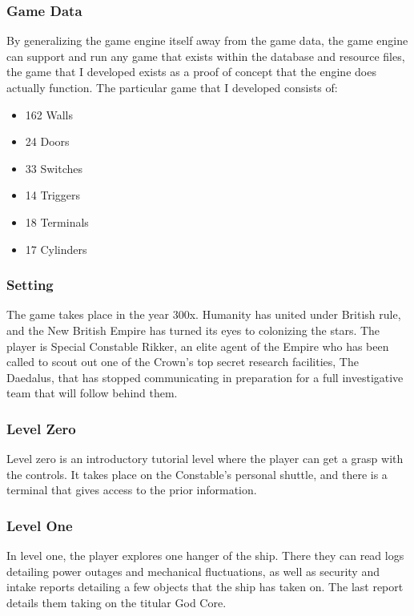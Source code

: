 \documentclass{article}
\begin{document}
\subsubsection{Game Data} \label{subsubsec:gamedata}

By generalizing the game engine itself away from the game data, the game engine can support and run any game that exists within the database and resource files, the game that I developed exists as a proof of concept that the engine does actually function. The particular game that I developed consists of:

\begin{itemize}
	\item 162 Walls
	\item 24 Doors
	\item 33 Switches
	\item 14 Triggers
	\item 18 Terminals
	\item 17 Cylinders
\end{itemize}

\subsubsection{Setting} \label{subsubsec:setting}

The game takes place in the year 300x. Humanity has united under British rule, and the New British Empire has turned its eyes to colonizing the stars. The player is Special Constable Rikker, an elite agent of the Empire who has been called to scout out one of the Crown's top secret research facilities, The Daedalus, that has stopped communicating in preparation for a full investigative team that will follow behind them.

\subsubsection{Level Zero} \label{subsubsec:levelzero}

Level zero is an introductory tutorial level where the player can get a grasp with the controls. It takes place on the Constable's personal shuttle, and there is a terminal that gives access to the prior information.

\subsubsection{Level One} \label{subsubsec:levelone}

In level one, the player explores one hanger of the ship. There they can read logs detailing power outages and mechanical fluctuations, as well as security and intake reports detailing a few objects that the ship has taken on. The last report details them taking on the titular God Core.
\end{document}
